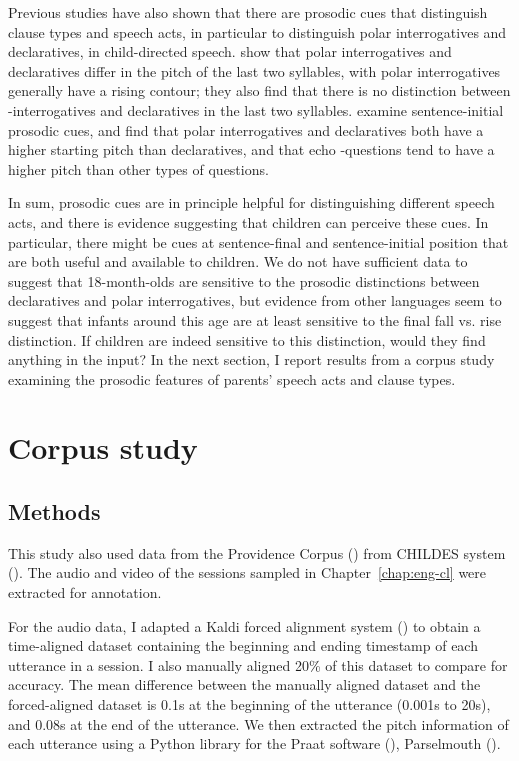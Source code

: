 Previous studies have also shown that there are prosodic cues that distinguish clause types and speech acts, in particular to distinguish polar interrogatives and declaratives, in child-directed speech. \textcite{geffenmintz2017final} show that polar interrogatives and declaratives differ in the pitch of the last two syllables, with polar interrogatives generally have a rising contour; they also find that there is no distinction between \twh-interrogatives and declaratives in the last two syllables. \textcite{chianggeffenmintz2018initial} examine sentence-initial prosodic cues, and find that polar interrogatives and declaratives both have a higher starting pitch than declaratives, and that echo \twh-questions tend to have a higher pitch than other types of questions. %

In sum, prosodic cues are in principle helpful for distinguishing different speech acts, and there is evidence suggesting that children can perceive these cues. In particular, there might be cues at sentence-final and sentence-initial position that are both useful and available to children. We do not have sufficient data to suggest that 18-month-olds are sensitive to the prosodic distinctions between declaratives and polar interrogatives, but evidence from other languages seem to suggest that infants around this age are at least sensitive to the final fall vs. rise distinction. If children are indeed sensitive to this distinction, would they find anything in the input? In the next section, I report results from a corpus study examining the prosodic features of parents' speech acts and clause types.

\section{Corpus study}
\label{sec:prosody:corpus}


\subsection{Methods}
\label{sec:engsp:corpus:method}
This study also used data from the Providence Corpus (\citealt{ProvidenceCorpus}) from CHILDES system (\citealt{CHILDES}). The audio and video of the sessions sampled in Chapter~\ref{chap:eng-cl} were extracted for annotation. 

For the audio data, I adapted a Kaldi forced alignment system (\cite{kaldi}) to obtain a time-aligned dataset containing the beginning and ending timestamp of each utterance in a session. I also manually aligned 20\% of this dataset to compare for accuracy. The mean difference between the manually aligned dataset and the forced-aligned dataset is 0.1s at the beginning of the utterance (0.001s to 20s), and 0.08s at the end of the utterance. We then extracted the pitch information of each utterance using a Python library for the Praat software (\cite{praat}), Parselmouth (\cite{parselmouth}). 


